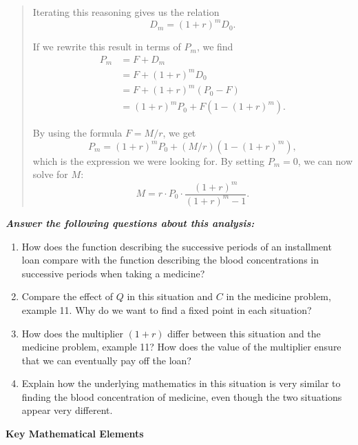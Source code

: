{\begin{quote}
      Iterating this reasoning gives us the relation
      $$
        D_m = (1 + r)^m D_0.
      $$

      If we rewrite this result in terms of $P_m$, we find
      \begin{align*}
        P_m
          &=F+D_m \\
          &=F+(1+r)^mD_0 \\
          &=F+(1+r)^m(P_0-F) \\
          &=(1+r)^mP_0+F\left(1-(1+r)^m\right).
      \end{align*}

      By using the formula $F = M/r$, we get
      $$
        P_m=(1+r)^mP_0+(M/r)\left(1-(1+r)^m\right),
      $$
      which is the expression we were looking for. By setting $P_m = 0$, we can now solve for $M$:
      $$
        M=r\cdot P_0\cdot \frac{(1+r)^m}{(1+r)^m-1}.
      $$
    \end{quote}\vspace{.35\baselineskip}

    \textbf{\emph{Answer the following questions about this analysis:}}

    \begin{enumerate}
      \item How does the function describing the successive periods of an installment loan compare with the function describing the blood concentrations in successive periods when taking a medicine?

      \item Compare the effect of $Q$ in this situation and $C$ in the medicine problem, example 11. Why do we want to find a fixed point in each situation?\vspace{\baselineskip}

      \item How does the multiplier $(1 + r)$ differ between this situation and the medicine problem, example 11? How does the value of the multiplier ensure that we can eventually pay off the loan?

      \item Explain how the underlying mathematics in this situation is very similar to finding the blood concentration of medicine, even though the two situations appear very different.
    \end{enumerate}

    \textbf{Key Mathematical Elements}

    \begin{hanglist}


\end{hanglist}}
